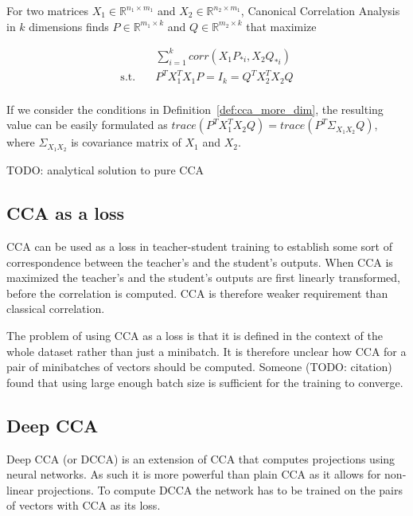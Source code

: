 \begin{defn}\label{def:cca_more_dim}

  For two matrices $X_1 \in \mathbb{R}^{n_1 \times m_1}$ and $X_2 \in
  \mathbb{R}^{n_2 \times m_1}$, Canonical Correlation Analysis in $k$
  dimensions finds $P \in \mathbb{R}^{m_1 \times k}$ and $Q \in \mathbb{R}^{m_2
  \times k}$ that maximize

  \begin{equation}
    \begin{split}
      &\sum_{i = 1}^k corr(X_1P_{*i}, X_2Q_{*i}) \\
      \text{s.t.}\quad &P^TX_1^TX_1P = I_k = Q^TX_2^TX_2Q \\
    \end{split}
  \end{equation}


\end{defn}

If we consider the conditions in Definition~\ref{def:cca_more_dim}, the
resulting value can be easily formulated as $trace(P^TX_1^TX_2Q) =
trace(P^T\Sigma_{X_1X_2}Q)$, where $\Sigma_{X_1X_2}$ is covariance matrix of
$X_1$ and $X_2$.

TODO: analytical solution to pure CCA

\subsection{CCA as a loss}

CCA can be used as a loss in teacher-student training to establish some sort of
correspondence between the teacher's and the student's outputs. When CCA is
maximized the teacher's and the student's outputs are first linearly
transformed, before the correlation is computed. CCA is therefore weaker
requirement than classical correlation.

The problem of using CCA as a loss is that it is defined in the context of the
whole dataset rather than just a minibatch. It is therefore unclear how CCA for
a pair of minibatches of vectors should be computed. Someone (TODO: citation)
found that using large enough batch size is sufficient for the training to
converge.

\subsection{Deep CCA}

Deep CCA (or DCCA) is an extension of CCA that computes projections using
neural networks. As such it is more powerful than plain CCA as it allows for
non-linear projections. To compute DCCA the network has to be trained on the
pairs of vectors with CCA as its loss.

